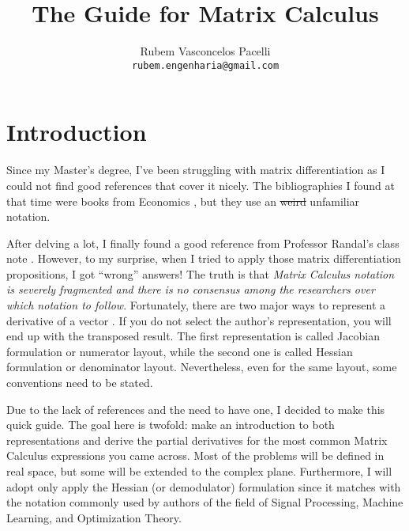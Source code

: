 \documentclass{article}
\title{\textbf{The Guide for Matrix Calculus}  \vspace{-.3cm}}
\author{Rubem Vasconcelos Pacelli\\
  {\tt rubem.engenharia@gmail.com}}
\affil{Department of Teleinformatics Engineering, Federal University of Ceará.\\Fortaleza, Ceará, Brazil. \vspace{-.5cm}}
\begin{document}
\maketitle
\tableofcontents
\newpage
\section{Introduction}
Since my Master's degree, I've been struggling with matrix differentiation as I could not find good references that cover it nicely. The bibliographies I found at that time were books from Economics \cite{dhrymes1978mathematics}, but they use an \st{weird} unfamiliar notation.

After delving a lot, I finally found a good reference from Professor Randal's class note \cite{barnes2006matrix}. However, to my surprise, when I tried to apply those matrix differentiation propositions, I got ``wrong'' answers! The truth is that \emph{Matrix Calculus notation is severely fragmented and there is no consensus among the researchers over which notation to follow}. Fortunately, there are two major ways to represent a derivative of a vector \cite{Singh}. If you do not select the author's representation, you will end up with the transposed result. The first representation is called Jacobian formulation or numerator layout, while the second one is called Hessian formulation or denominator layout. Nevertheless, even for the same layout, some conventions need to be stated.

Due to the lack of references and the need to have one, I decided to make this quick guide. The goal here is twofold: make an introduction to both representations and derive the partial derivatives for the most common Matrix Calculus expressions you came across. Most of the problems will be defined in real space, but some will be extended to the complex plane. Furthermore, I will adopt only apply the Hessian (or demodulator) formulation since it matches with the notation commonly used by authors of the field of Signal Processing, Machine Learning, and Optimization Theory.
\end{document}
